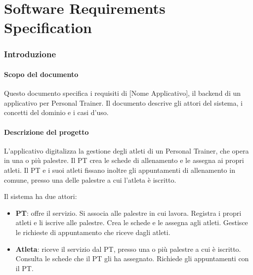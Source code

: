 \part{Software Requirements Specification}

\section{Introduzione}
\subsection{Scopo del documento}
Questo documento specifica i requisiti di [Nome Applicativo], il backend di un
applicativo per Personal Trainer. Il documento descrive gli attori del
sistema, i concetti del dominio e i casi d'uso.

\subsection{Descrizione del progetto}
L'applicativo digitalizza la gestione degli atleti di un Personal
Trainer, che opera in una o più palestre. Il PT crea le schede di
allenamento e le assegna ai propri atleti. Il PT e i suoi atleti
fissano inoltre gli appuntamenti di allenamento in comune, presso una
delle palestre a cui l'atleta è iscritto.

Il sistema ha due attori:
\begin{itemize}
  \item \textbf{PT}: offre il servizio. Si associa alle palestre in
    cui lavora. Registra i propri atleti e li iscrive alle palestre.
    Crea le schede e le assegna agli atleti. Gestisce le richieste di
    appuntamento che riceve dagli atleti.
  \item \textbf{Atleta}: riceve il servizio dal PT, presso una o più
    palestre a cui è iscritto. Consulta le schede che il PT gli ha
    assegnato. Richiede gli appuntamenti con il PT.
\end{itemize}


